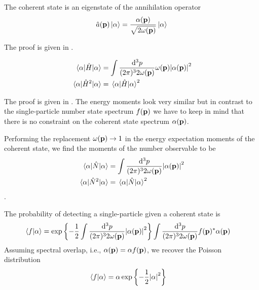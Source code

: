\begin{theorem}\label{thm:coherent_state_annihilation_eigenvalue}
	The coherent state is an eigenstate of the annihilation operator
	\begin{equation}
		\hat{a}(\vb{p})
		\ket{\alpha}
		=
		\frac{\alpha(\vb{p})}{\sqrt{2\omega(\vb{p})}}
		\ket{\alpha}
	\end{equation}
\end{theorem}
The proof is given in .

\begin{lemma}\label{thm:coherent_state_energy_observable}
	\begin{align}
		\expval{\hat{H}}{\alpha}
		&=
		\int\frac{\dd[3]{p}}{(2\pi)^32\omega(\vb{p})}
		\omega(\vb{p})
		\abs{\alpha(\vb{p})}^2
		\\
		\expval{\hat{H}^2}{\alpha}
		&=
		\expval{\hat{H}}{\alpha}^2
	\end{align}	
\end{lemma}
The proof is given in .
The energy moments look very similar but in contrast to the single-particle number state spectrum $f(\vb{p})$ we have to keep in mind that there is no constraint on the coherent state spectrum $\alpha(\vb{p})$.
\begin{corollary}
	Performing the replacement $\omega(\vb{p})\to1$ in the energy expectation moments of the coherent state, we find the moments of the number observable to be
	\begin{align}
		\expval{\hat{N}}{\alpha}
		&=
		\int\frac{\dd[3]{p}}{(2\pi)^32\omega(\vb{p})}
		\abs{\alpha(\vb{p})}^2
		\\
		\expval{\hat{N}^2}{\alpha}
		&=
		\expval{\hat{N}}{\alpha}^2
	\end{align}
	.
\end{corollary}

\begin{lemma}
	The probability of detecting a single-particle given a coherent state is
	\begin{equation}
		\begin{split}
			\braket{f}{\alpha}
			&=
			\exp\left\{
				-
				\frac{1}{2}
				\int\frac{\dd[3]{p}}{(2\pi)^32\omega(\vb{p})}
				\abs{\alpha(\vb{p})}^2
			\right\}
			\int\frac{\dd[3]{p}}{(2\pi)^32\omega(\vb{p})}
			f(\vb{p})^*
			\alpha(\vb{p})
		\end{split}
	\end{equation}
	Assuming spectral overlap, i.e., $\alpha(\vb{p})=\alpha f(\vb{p})$, we recover the Poisson distribution
	\begin{equation}
		\begin{split}
			\braket{f}{\alpha}
			&=
			\alpha
			\exp\left\{
				-
				\frac{1}{2}
				\abs{\alpha}^2
			\right\}
		\end{split}
	\end{equation}
\end{lemma}
